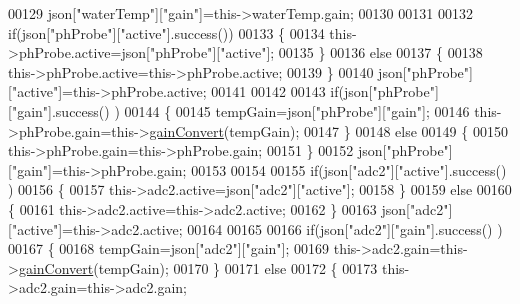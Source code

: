 \begin{DoxyCode}
00129             json[\textcolor{stringliteral}{"waterTemp"}][\textcolor{stringliteral}{"gain"}]=this->waterTemp.gain;
00130 
00131             
00132             \textcolor{keywordflow}{if}(json[\textcolor{stringliteral}{"phProbe"}][\textcolor{stringliteral}{"active"}].success())
00133             \{
00134                 this->phProbe.active=json[\textcolor{stringliteral}{"phProbe"}][\textcolor{stringliteral}{"active"}];
00135             \}
00136             \textcolor{keywordflow}{else}
00137             \{
00138                 this->phProbe.active=this->phProbe.active;
00139             \}
00140             json[\textcolor{stringliteral}{"phProbe"}][\textcolor{stringliteral}{"active"}]=this->phProbe.active;
00141     
00142             
00143             \textcolor{keywordflow}{if}(json[\textcolor{stringliteral}{"phProbe"}][\textcolor{stringliteral}{"gain"}].success() )
00144             \{       
00145                 tempGain=json[\textcolor{stringliteral}{"phProbe"}][\textcolor{stringliteral}{"gain"}];
00146                 this->phProbe.gain=this->\hyperlink{class_irene3000_abcad62d1201a59f8dd3ba87048002728}{gainConvert}(tempGain);          
00147             \}
00148             \textcolor{keywordflow}{else}
00149             \{
00150                 this->phProbe.gain=this->phProbe.gain;
00151             \}
00152             json[\textcolor{stringliteral}{"phProbe"}][\textcolor{stringliteral}{"gain"}]=this->phProbe.gain;
00153 
00154             
00155             \textcolor{keywordflow}{if}(json[\textcolor{stringliteral}{"adc2"}][\textcolor{stringliteral}{"active"}].success() )
00156             \{
00157                 this->adc2.active=json[\textcolor{stringliteral}{"adc2"}][\textcolor{stringliteral}{"active"}];
00158             \}
00159             \textcolor{keywordflow}{else}
00160             \{
00161                 this->adc2.active=this->adc2.active;
00162             \}
00163             json[\textcolor{stringliteral}{"adc2"}][\textcolor{stringliteral}{"active"}]=this->adc2.active;
00164 
00165             
00166             \textcolor{keywordflow}{if}(json[\textcolor{stringliteral}{"adc2"}][\textcolor{stringliteral}{"gain"}].success() )
00167             \{           
00168                 tempGain=json[\textcolor{stringliteral}{"adc2"}][\textcolor{stringliteral}{"gain"}];
00169                 this->adc2.gain=this->\hyperlink{class_irene3000_abcad62d1201a59f8dd3ba87048002728}{gainConvert}(tempGain);
00170             \}
00171             \textcolor{keywordflow}{else}
00172             \{
00173                 this->adc2.gain=this->adc2.gain;

\end{DoxyCode}

